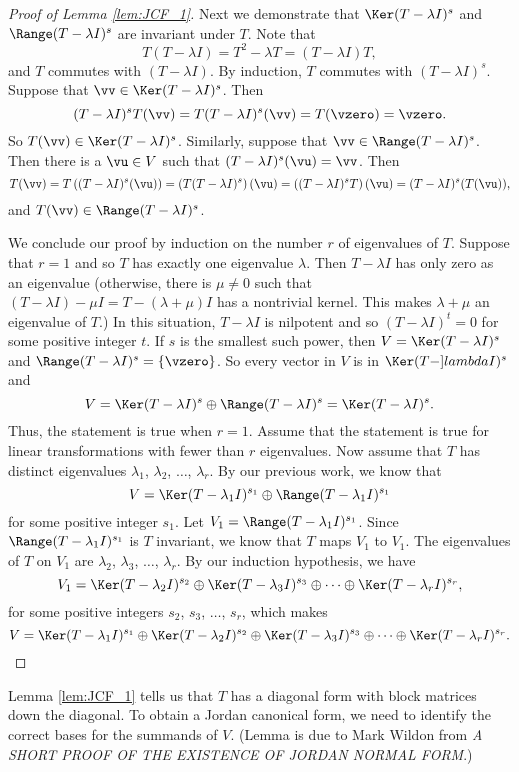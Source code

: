 \begin{proof}[Proof of Lemma \ref{lem:JCF_1}]
Next we demonstrate that  $\Ker(T - \lambda I)^s$ and $\Range(T - \lambda I)^s$ are invariant under $T$. Note that 
\[T(T - \lambda I) = T^2 - \lambda T = (T-\lambda I)T,\]
and $T$ commutes with $(T - \lambda I)$. By induction, $T$ commutes with $(T - \lambda I)^s$. Suppose that $\vv \in \Ker(T - \lambda I)^s$. Then 
\[(T - \lambda I)^sT(\vv) = T(T - \lambda I)^s(\vv) = T(\vzero) = \vzero.\]
So $T(\vv) \in \Ker(T - \lambda I)^s$. Similarly, suppose that $\vv \in \Range(T - \lambda I)^s$. Then there is a $\vu \in V$ such that $(T - \lambda I)^s(\vu) = \vv$. Then 
\[T(\vv) = T\left((T - \lambda I)^s(\vu)\right) = \left(T(T - \lambda I)^s\right)(\vu) = \left((T - \lambda I)^sT\right)(\vu) = (T - \lambda I)^s(T(\vu)),\]
and $T(\vv) \in \Range(T - \lambda I)^s$. 

We conclude our proof by induction on the number $r$ of eigenvalues of $T$. Suppose that $r=1$ and so $T$ has exactly one eigenvalue $\lambda$. Then $T-\lambda I$ has only zero as an eigenvalue (otherwise, there is $\mu \neq 0$ such that $(T - \lambda I) - \mu I = T - (\lambda+\mu)I$ has a nontrivial kernel. This makes $\lambda+\mu$ an eigenvalue of $T$.) In this situation, $T - \lambda I$ is nilpotent and so $(T - \lambda I)^t = 0$ for some positive integer $t$. If $s$ is the smallest such power, then $V =  \Ker(T - \lambda I)^s$ and $\Range(T - \lambda I)^s = \{\vzero\}$. So every vector in $V$ is in $\Ker(T - ]lambda I)^s$ and
\[V = \Ker(T - \lambda I)^s \oplus \Range(T - \lambda I)^s = \Ker(T - \lambda I)^s.\]
Thus, the statement is true when $r=1$. Assume that the statement is true for linear transformations with fewer than $r$ eigenvalues. Now assume that $T$ has distinct eigenvalues $\lambda_1$, $\lambda_2$, $\ldots$, $\lambda_r$. By our previous work, we know that 
\[V = \Ker(T - \lambda_1 I)^{s_1} \oplus \Range(T - \lambda_1 I)^{s_1}\]
for some positive integer $s_1$. Let $V_1 = \Range(T - \lambda_1 I)^{s_1}$. Since $\Range(T - \lambda_1 I)^{s_1}$ is $T$ invariant, we know that $T$ maps $V_1$ to $V_1$. The eigenvalues of $T$ on $V_1$ are $\lambda_2$, $\lambda_3$, $\ldots$, $\lambda_r$. By our induction hypothesis, we have 
\[V_1 = \Ker(T-\lambda_2 I)^{s_2} \oplus \Ker(T-\lambda_3 I)^{s_3} \oplus \cdots \oplus \Ker(T-\lambda_r I)^{s_r},\]
for some positive integers $s_2$, $s_3$, $\ldots$, $s_r$, which makes 
\[V = \Ker(T-\lambda_1 I)^{s_1} \oplus \Ker(T-\lambda_2 I)^{s_2} \oplus \Ker(T-\lambda_3 I)^{s_3} \oplus \cdots \oplus \Ker(T-\lambda_r I)^{s_r}.\]
 \end{proof}

Lemma \ref{lem:JCF_1} tells us that $T$ has a diagonal form with block matrices down the diagonal. To obtain a Jordan canonical form, we need to identify the correct bases for the summands of $V$. (Lemma \label{lem:JCF_2} is due to Mark Wildon from \emph{A SHORT PROOF OF THE EXISTENCE OF JORDAN NORMAL FORM}.)
 
